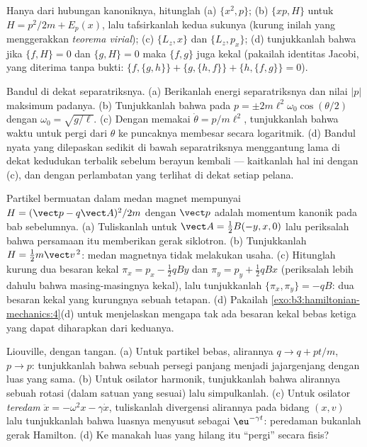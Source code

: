 \begin{exercise}[$\star$]\label{exo:b3:hamiltonian-mechanics:4}
Hanya dari hubungan kanoniknya, hitunglah (a) $\{x^2, p\}$; (b)
$\{xp, H\}$ untuk $H = p^2/2m + E_p(x)$, lalu tafsirkanlah kedua
sukunya (kurung inilah yang menggerakkan \emph{teorema virial}); (c)
$\{L_z, x\}$ dan $\{L_z, p_x\}$; (d) tunjukkanlah bahwa jika
$\{f, H\} = 0$ dan $\{g, H\} = 0$ maka $\{f, g\}$ juga kekal (pakailah
identitas Jacobi, yang diterima tanpa bukti:
$\{f,\{g,h\}\} + \{g,\{h,f\}\} + \{h,\{f,g\}\} = 0$).
\end{exercise}

\begin{exercise}[$\star\star$]\label{exo:b3:hamiltonian-mechanics:5}
Bandul di dekat separatriksnya. (a) Berikanlah energi separatriksnya dan
nilai $|p|$ maksimum padanya. (b) Tunjukkanlah bahwa pada  $p =
\pm 2m\ell^2\omega_0\cos(\theta/2)$ dengan $\omega_0 = \sqrt{g/\ell}$.
(c) Dengan memakai $\dot\theta = p/m\ell^2$, tunjukkanlah bahwa waktu
untuk pergi dari $\theta$ ke puncaknya membesar secara logaritmik. (d)
Bandul nyata yang dilepaskan sedikit di bawah separatriksnya menggantung
lama di dekat kedudukan terbalik sebelum berayun kembali --- kaitkanlah
hal ini dengan (c), dan dengan perlambatan yang terlihat di dekat setiap
pelana.
\end{exercise}

\begin{exercise}[$\star\star$]\label{exo:b3:hamiltonian-mechanics:6}
Partikel bermuatan dalam medan magnet mempunyai $H = (\vect p -
q\vect A)^2/2m$ dengan $\vect p$ adalah momentum kanonik pada bab
sebelumnya. (a) Tuliskanlah  untuk $\vect A = \tfrac12
B(-y, x, 0)$ lalu periksalah bahwa persamaan itu memberikan gerak
siklotron. (b) Tunjukkanlah $H =
\tfrac12 m\vect v^{\,2}$: medan magnetnya tidak melakukan usaha. (c)
Hitunglah kurung dua besaran kekal $\pi_x = p_x - \tfrac12
qBy$ dan $\pi_y = p_y + \tfrac12 qBx$ (periksalah lebih dahulu bahwa
masing-masingnya kekal), lalu tunjukkanlah $\{\pi_x, \pi_y\} = -qB$: dua
besaran kekal yang kurungnya sebuah tetapan. (d) Pakailah
\cref{exo:b3:hamiltonian-mechanics:4}(d) untuk menjelaskan mengapa tak
ada besaran kekal bebas ketiga yang dapat diharapkan dari keduanya.
\end{exercise}

\begin{exercise}[$\star\star$]\label{exo:b3:hamiltonian-mechanics:7}
Liouville, dengan tangan. (a) Untuk partikel bebas, alirannya $q \to q +
pt/m$, $p \to p$: tunjukkanlah bahwa sebuah persegi panjang menjadi
jajargenjang dengan luas yang sama. (b) Untuk osilator harmonik,
tunjukkanlah bahwa alirannya sebuah rotasi (dalam satuan yang sesuai)
lalu simpulkanlah. (c) Untuk osilator \emph{teredam}
$\ddot x = -\omega^2x - \gamma\dot x$, tuliskanlah divergensi alirannya
pada bidang $(x, v)$ lalu tunjukkanlah bahwa luasnya menyusut sebagai
$\eu^{-\gamma t}$: peredaman bukanlah gerak Hamilton. (d) Ke manakah
luas yang hilang itu ``pergi'' secara fisis?
\end{exercise}

